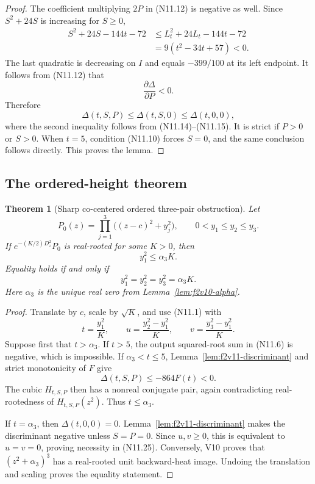 \documentclass[11pt]{article}
\newtheorem{theorem}{Theorem}[section]
\theoremstyle{definition}
\theoremstyle{remark}
\begin{document}
\begin{proof}
The coefficient multiplying \(2P\) in \textup{(N11.12)} is negative as
well.  Since \(S^2+24S\) is increasing for \(S\ge0\),
\[
\begin{aligned}
 S^2+24S-144t-72
 &\le L_t^2+24L_t-144t-72\\
 &=9(t^2-34t+57)<0.
\end{aligned}
\tag{N11.20}
\]
The last quadratic is decreasing on \(I\) and equals
\(-399/100\) at its left endpoint.  It follows from
\textup{(N11.12)} that
\[
 \frac{\partial\Delta}{\partial P}<0.
 \tag{N11.21}
\]
Therefore
\[
 \Delta(t,S,P)\le\Delta(t,S,0)
 \le\Delta(t,0,0),
 \tag{N11.22}
\]
where the second inequality follows from
\textup{(N11.14)}--\textup{(N11.15)}.  It is strict if \(P>0\) or
\(S>0\).  When \(t=5\), condition \textup{(N11.10)} forces \(S=0\),
and the same conclusion follows directly.  This proves the lemma.
\end{proof}

\subsection{The ordered-height theorem}

\begin{theorem}[Sharp co-centered ordered three-pair obstruction]
\label{thm:f2v11-ordered}
Let
\[
 P_0(z)=
 \prod_{j=1}^3\bigl((z-c)^2+y_j^2\bigr),
 \qquad
 0<y_1\le y_2\le y_3.
 \tag{N11.23}
\]
If \(e^{-(K/2)D_z^2}P_0\) is real-rooted for some \(K>0\), then
\[
 \boxed{y_1^2\le\alpha_3K.}
 \tag{N11.24}
\]
Equality holds if and only if
\[
 y_1^2=y_2^2=y_3^2=\alpha_3K.
 \tag{N11.25}
\]
Here \(\alpha_3\) is the unique real zero from
Lemma~\ref{lem:f2v10-alpha}.
\end{theorem}

\begin{proof}
Translate by \(c\), scale by \(\sqrt K\), and use
\textup{(N11.1)} with
\[
 t=\frac{y_1^2}{K},\qquad
 u=\frac{y_2^2-y_1^2}{K},\qquad
 v=\frac{y_3^2-y_1^2}{K}.
 \tag{N11.26}
\]
Suppose first that \(t>\alpha_3\).  If \(t>5\), the output squared-root
sum in \textup{(N11.6)} is negative, which is impossible.  If
\(\alpha_3<t\le5\), Lemma~\ref{lem:f2v11-discriminant} and strict
monotonicity of \(F\) give
\[
 \Delta(t,S,P)
 \le-864F(t)<0.
 \tag{N11.27}
\]
The cubic \(H_{t,S,P}\) then has a nonreal conjugate pair, again
contradicting real-rootedness of \(H_{t,S,P}(z^2)\).  Thus
\(t\le\alpha_3\).

If \(t=\alpha_3\), then \(\Delta(t,0,0)=0\).
Lemma~\ref{lem:f2v11-discriminant} makes the discriminant negative unless
\(S=P=0\).  Since \(u,v\ge0\), this is equivalent to \(u=v=0\), proving
necessity in \textup{(N11.25)}.  Conversely, V10 proves that
\((z^2+\alpha_3)^3\) has a real-rooted unit backward-heat image.  Undoing
the translation and scaling proves the equality statement.
\end{proof}
\end{document}

